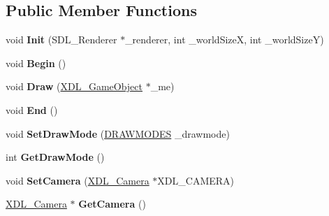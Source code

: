 \subsection*{Public Member Functions}
\begin{DoxyCompactItemize}
\item 
\hypertarget{class_x_d_l___sprite_batch_a0ee6240197106c7ad2061226da69ba47}{void {\bfseries Init} (S\-D\-L\-\_\-\-Renderer $\ast$\-\_\-renderer, int \-\_\-world\-Size\-X, int \-\_\-world\-Size\-Y)}\label{class_x_d_l___sprite_batch_a0ee6240197106c7ad2061226da69ba47}

\item 
\hypertarget{class_x_d_l___sprite_batch_af6db9acdec8c4b1f31275b24d99d50d4}{void {\bfseries Begin} ()}\label{class_x_d_l___sprite_batch_af6db9acdec8c4b1f31275b24d99d50d4}

\item 
\hypertarget{class_x_d_l___sprite_batch_a63a34e3458a687841c8a9c3d1de876b6}{void {\bfseries Draw} (\hyperlink{class_x_d_l___game_object}{X\-D\-L\-\_\-\-Game\-Object} $\ast$\-\_\-me)}\label{class_x_d_l___sprite_batch_a63a34e3458a687841c8a9c3d1de876b6}

\item 
\hypertarget{class_x_d_l___sprite_batch_a60d1f227cf1ef2270f58711b6d37a20f}{void {\bfseries End} ()}\label{class_x_d_l___sprite_batch_a60d1f227cf1ef2270f58711b6d37a20f}

\item 
\hypertarget{class_x_d_l___sprite_batch_a696b70cf462c9bad88f255f3f8a79506}{void {\bfseries Set\-Draw\-Mode} (\hyperlink{class_x_d_l___sprite_batch_a0dba0557842cdf21917adc2ef44125e6}{D\-R\-A\-W\-M\-O\-D\-E\-S} \-\_\-drawmode)}\label{class_x_d_l___sprite_batch_a696b70cf462c9bad88f255f3f8a79506}

\item 
\hypertarget{class_x_d_l___sprite_batch_a48fa9280c8a1dc5c93a3732adacca526}{int {\bfseries Get\-Draw\-Mode} ()}\label{class_x_d_l___sprite_batch_a48fa9280c8a1dc5c93a3732adacca526}

\item 
\hypertarget{class_x_d_l___sprite_batch_aff9895e54f671c94c83613731c11fc2e}{void {\bfseries Set\-Camera} (\hyperlink{class_x_d_l___camera}{X\-D\-L\-\_\-\-Camera} $\ast$X\-D\-L\-\_\-\-C\-A\-M\-E\-R\-A)}\label{class_x_d_l___sprite_batch_aff9895e54f671c94c83613731c11fc2e}

\item 
\hypertarget{class_x_d_l___sprite_batch_a32ddb6e2d599029bc2e6de79c8437210}{\hyperlink{class_x_d_l___camera}{X\-D\-L\-\_\-\-Camera} $\ast$ {\bfseries Get\-Camera} ()}\label{class_x_d_l___sprite_batch_a32ddb6e2d599029bc2e6de79c8437210}

\end{DoxyCompactItemize}
